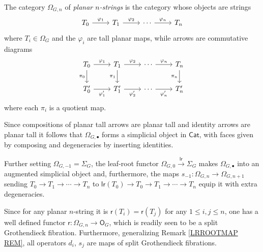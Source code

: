\documentclass[a4paper,10pt]{article}%
\begin{document}
\begin{definition}
	The category $\Omega_{G,n}$ of 
	\textit{planar $n$-strings} is the category whose objects are strings
	\[
	\begin{tikzcd}
	T_0 \ar{r}{\varphi_1} & T_1 \ar{r}{\varphi_2} & \cdots \ar{r}{\varphi_n} & T_n
	\end{tikzcd}	
	\]
	where $T_i \in \Omega_G$ and the $\varphi_i$ are tall planar maps, while arrows are commutative diagrams 
	\begin{equation} \label{PTNARROW EQ}
	\begin{tikzcd}
	T_0 \ar{r}{\varphi_1} \ar{d}[swap]{\pi_0} & T_1 \ar{r}{\varphi_2} \ar{d}[swap]{\pi_1} & \cdots \ar{r}{\varphi_n} & T_n \ar{d}[swap]{\pi_n}
\\
	T'_0 \ar{r}[swap]{\varphi'_1} & T'_1 \ar{r}[swap]{\varphi'_2} & \cdots \ar{r}[swap]{\varphi'_n} & T'_n
	\end{tikzcd}	
	\end{equation}
where each $\pi_i$ is a quotient map.
\end{definition}


\begin{notation}\label{SIMPOPERATORS NOT}
	Since compositions of planar tall arrows are planar tall
	and identity arrows are planar tall	
	it follows that 
	$\Omega_{G,\bullet}$
	forms a simplicial object in $\mathsf{Cat}$, 
	with faces given by composing and degeneracies by inserting identities. 

	Further setting 
	$\Omega_{G,-1} = \Sigma_G$, the leaf-root functor $\Omega_{G,0} \xrightarrow{\mathsf{lr}} \Sigma_G$ makes 
	$\Omega_{G,\bullet}$ into an augmented simplicial object and, furthermore, the maps 
	$s_{-1} \colon \Omega_{G,n} \to \Omega_{G,n+1}$
sending $T_0 \to T_1 \to \cdots \to T_n$ to 
$\mathsf{lr}(T_0) \to T_0 \to T_1 \to \cdots \to T_n$ equip it with extra degeneracies.
\end{notation}

\begin{remark}
Since for any planar $n$-string it is 
$\mathsf{r}(T_i) = \mathsf{r}(T_j)$
for any $1 \leq i,j \leq n$, 
one has a well defined functor
$\mathsf{r} \colon \Omega_{G,n} \to \mathsf{O}_G$,
which is readily seen to be a split Grothendieck fibration.
Furthermore, generalizing Remark \ref{LRROOTMAP REM},
all operators $d_i$, $s_j$ 
are maps of split Grothendieck fibrations.
\end{remark}
\end{document}
